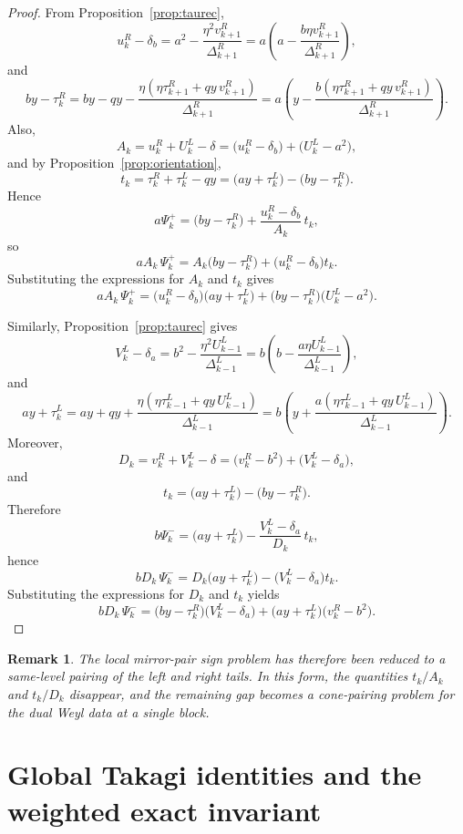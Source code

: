 \documentclass[11pt]{article}
\newtheorem{remark}[theorem]{Remark}
\begin{document}
\begin{proof}
From Proposition~\ref{prop:taurec},
\[
u_k^R-\delta_b
=
a^2-\frac{\eta^2 v_{k+1}^R}{\Delta_{k+1}^R}
=
a\left(a-\frac{b\eta v_{k+1}^R}{\Delta_{k+1}^R}\right),
\]
and
\[
by-\tau_k^R
=
by-qy-\frac{\eta(\eta\tau_{k+1}^R+qy\,v_{k+1}^R)}{\Delta_{k+1}^R}
=
a\left(
y-\frac{b(\eta\tau_{k+1}^R+qy\,v_{k+1}^R)}{\Delta_{k+1}^R}
\right).
\]
Also,
\[
A_k
=
u_k^R+U_k^L-\delta
=
\bigl(u_k^R-\delta_b\bigr)+\bigl(U_k^L-a^2\bigr),
\]
and by Proposition~\ref{prop:orientation},
\[
t_k
=
\tau_k^R+\tau_k^L-qy
=
\bigl(ay+\tau_k^L\bigr)-\bigl(by-\tau_k^R\bigr).
\]
Hence
\[
a\Psi_k^+
=
\bigl(by-\tau_k^R\bigr)
+
\frac{u_k^R-\delta_b}{A_k}\,t_k,
\]
so
\[
aA_k\,\Psi_k^+
=
A_k\bigl(by-\tau_k^R\bigr)+\bigl(u_k^R-\delta_b\bigr)t_k.
\]
Substituting the expressions for \(A_k\) and \(t_k\) gives
\[
aA_k\,\Psi_k^+
=
\bigl(u_k^R-\delta_b\bigr)\bigl(ay+\tau_k^L\bigr)
+
\bigl(by-\tau_k^R\bigr)\bigl(U_k^L-a^2\bigr).
\]

Similarly, Proposition~\ref{prop:taurec} gives
\[
V_k^L-\delta_a
=
b^2-\frac{\eta^2 U_{k-1}^L}{\Delta_{k-1}^L}
=
b\left(b-\frac{a\eta U_{k-1}^L}{\Delta_{k-1}^L}\right),
\]
and
\[
ay+\tau_k^L
=
ay+qy+\frac{\eta(\eta\tau_{k-1}^L+qy\,U_{k-1}^L)}{\Delta_{k-1}^L}
=
b\left(
y+\frac{a(\eta\tau_{k-1}^L+qy\,U_{k-1}^L)}{\Delta_{k-1}^L}
\right).
\]
Moreover,
\[
D_k
=
v_k^R+V_k^L-\delta
=
\bigl(v_k^R-b^2\bigr)+\bigl(V_k^L-\delta_a\bigr),
\]
and
\[
t_k
=
\bigl(ay+\tau_k^L\bigr)-\bigl(by-\tau_k^R\bigr).
\]
Therefore
\[
b\Psi_k^-
=
\bigl(ay+\tau_k^L\bigr)
-
\frac{V_k^L-\delta_a}{D_k}\,t_k,
\]
hence
\[
bD_k\,\Psi_k^-
=
D_k\bigl(ay+\tau_k^L\bigr)-\bigl(V_k^L-\delta_a\bigr)t_k.
\]
Substituting the expressions for \(D_k\) and \(t_k\) yields
\[
bD_k\,\Psi_k^-
=
\bigl(by-\tau_k^R\bigr)\bigl(V_k^L-\delta_a\bigr)
+
\bigl(ay+\tau_k^L\bigr)\bigl(v_k^R-b^2\bigr).
\]
\end{proof}

\begin{remark}
The local mirror-pair sign problem has therefore been reduced to a same-level pairing of the
left and right tails. In this form, the quantities \(t_k/A_k\) and \(t_k/D_k\) disappear, and
the remaining gap becomes a cone-pairing problem for the dual Weyl data at a single block.
\end{remark}

\section{Global Takagi identities and the weighted exact invariant}\label{sec:takagi}
\end{document}
